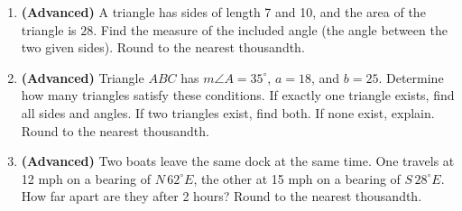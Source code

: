 \begin{enumerate}[leftmargin=*, label=\textbf{\arabic*.}, resume]
  \newpage
  \item \textbf{(Advanced)} A triangle has sides of length 7 and 10, and the area of the triangle is $28$. Find the measure of the included angle (the angle between the two given sides). Round to the nearest thousandth. 
  \vgappp

  \item \textbf{(Advanced)} Triangle $ABC$ has $m\angle A = 35^{\circ}$, $a = 18$, and $b = 25$. Determine how many triangles satisfy these conditions. If exactly one triangle exists, find all sides and angles. If two triangles exist, find both. If none exist, explain. Round to the nearest thousandth. 
  \vgappp

  \item \textbf{(Advanced)} Two boats leave the same dock at the same time. One travels at 12 mph on a bearing of $N\,62^{\circ}E$, the other at 15 mph on a bearing of $S\,28^{\circ}E$. How far apart are they after 2 hours? Round to the nearest thousandth. 
  \vgappp

\end{enumerate}
